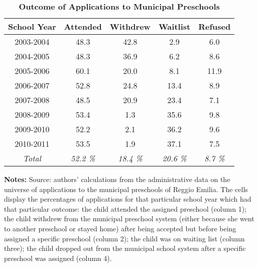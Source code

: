 
\begin{table}[ht!]
\caption{\textbf{\small Outcome of Applications to Municipal Preschools}}
\label{tab:OutcApps}
\begin{center}
\begin{tabular}{c c c c c }
\hline\hline
\textbf{School Year} & \textbf{Attended} & \textbf{Withdrew} & \textbf{Waitlist} & \textbf{Refused} \\
\hline
        2003-2004  &   48.3  &    42.8  &    2.9  &    6.0   \\[0.2em]
        2004-2005  &   48.3  &    36.9  &    6.2  &    8.6   \\[0.2em]
        2005-2006  &   60.1  &    20.0  &    8.1  &   11.9   \\[0.2em]
        2006-2007  &   52.8  &    24.8  &   13.4  &    8.9   \\[0.2em]
        2007-2008  &   48.5  &    20.9  &   23.4  &    7.1   \\[0.2em]
        2008-2009  &   53.4  &     1.3  &   35.6  &    9.8   \\[0.2em]
        2009-2010  &   52.2  &     2.1  &   36.2  &    9.6   \\[0.2em]
        2010-2011  &   53.5  &     1.9  &   37.1  &    7.5   \\[0.2em]
\hline
\textit{Total} &   \textit{52.2 \%} &   \textit{18.4 \%} &   \textit{20.6 \%} &    \textit{8.7 \%}  \\[0.2em]
\hline
\end{tabular}
\end{center}
\begin{flushleft}
\tiny{{\bfseries Notes:} Source: authors' calculations from the administrative data on the universe of applications to the municipal preschools of Reggio Emilia. The cells display the percentages of applications for that particular school year which had that particular outcome: the child attended the assigned preschool (column 1); the child withdrew from the municipal preschool system (either because she went to another preschool or stayed home) after being accepted but before being assigned a specific preschool (column 2); the child was on waiting list (column three); the child dropped out from the municipal school system after a specific preschool was assigned (column 4).}
\end{flushleft}
\end{table}
